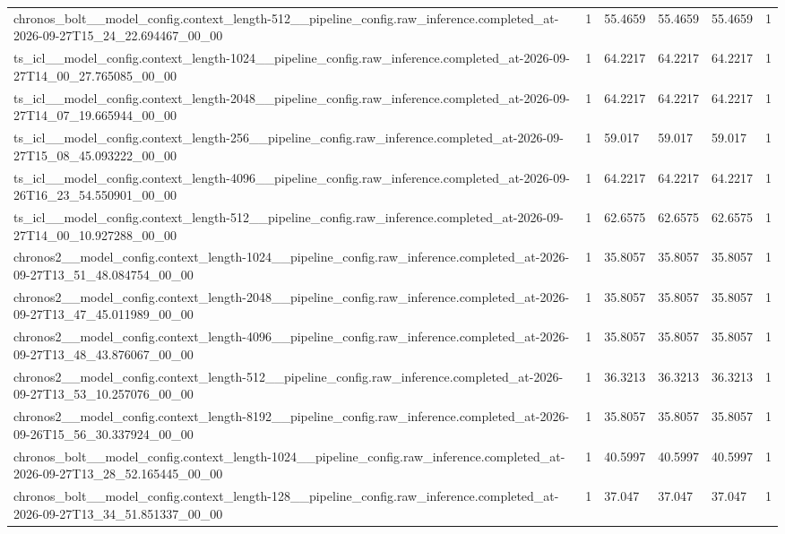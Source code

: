 \begin{tabular}{llllll}
chronos\_bolt\_\_model\_config.context\_length-512\_\_pipeline\_config.raw\_inference.completed\_at-2026-09-27T15\_24\_22.694467\_00\_00 & 1 & 55.4659 & 55.4659 & 55.4659 & 1 \\
ts\_icl\_\_model\_config.context\_length-1024\_\_pipeline\_config.raw\_inference.completed\_at-2026-09-27T14\_00\_27.765085\_00\_00 & 1 & 64.2217 & 64.2217 & 64.2217 & 1 \\
ts\_icl\_\_model\_config.context\_length-2048\_\_pipeline\_config.raw\_inference.completed\_at-2026-09-27T14\_07\_19.665944\_00\_00 & 1 & 64.2217 & 64.2217 & 64.2217 & 1 \\
ts\_icl\_\_model\_config.context\_length-256\_\_pipeline\_config.raw\_inference.completed\_at-2026-09-27T15\_08\_45.093222\_00\_00 & 1 & 59.017 & 59.017 & 59.017 & 1 \\
ts\_icl\_\_model\_config.context\_length-4096\_\_pipeline\_config.raw\_inference.completed\_at-2026-09-26T16\_23\_54.550901\_00\_00 & 1 & 64.2217 & 64.2217 & 64.2217 & 1 \\
ts\_icl\_\_model\_config.context\_length-512\_\_pipeline\_config.raw\_inference.completed\_at-2026-09-27T14\_00\_10.927288\_00\_00 & 1 & 62.6575 & 62.6575 & 62.6575 & 1 \\
chronos2\_\_model\_config.context\_length-1024\_\_pipeline\_config.raw\_inference.completed\_at-2026-09-27T13\_51\_48.084754\_00\_00 & 1 & 35.8057 & 35.8057 & 35.8057 & 1 \\
chronos2\_\_model\_config.context\_length-2048\_\_pipeline\_config.raw\_inference.completed\_at-2026-09-27T13\_47\_45.011989\_00\_00 & 1 & 35.8057 & 35.8057 & 35.8057 & 1 \\
chronos2\_\_model\_config.context\_length-4096\_\_pipeline\_config.raw\_inference.completed\_at-2026-09-27T13\_48\_43.876067\_00\_00 & 1 & 35.8057 & 35.8057 & 35.8057 & 1 \\
chronos2\_\_model\_config.context\_length-512\_\_pipeline\_config.raw\_inference.completed\_at-2026-09-27T13\_53\_10.257076\_00\_00 & 1 & 36.3213 & 36.3213 & 36.3213 & 1 \\
chronos2\_\_model\_config.context\_length-8192\_\_pipeline\_config.raw\_inference.completed\_at-2026-09-26T15\_56\_30.337924\_00\_00 & 1 & 35.8057 & 35.8057 & 35.8057 & 1 \\
chronos\_bolt\_\_model\_config.context\_length-1024\_\_pipeline\_config.raw\_inference.completed\_at-2026-09-27T13\_28\_52.165445\_00\_00 & 1 & 40.5997 & 40.5997 & 40.5997 & 1 \\
chronos\_bolt\_\_model\_config.context\_length-128\_\_pipeline\_config.raw\_inference.completed\_at-2026-09-27T13\_34\_51.851337\_00\_00 & 1 & 37.047 & 37.047 & 37.047 & 1 \\

\end{tabular}
